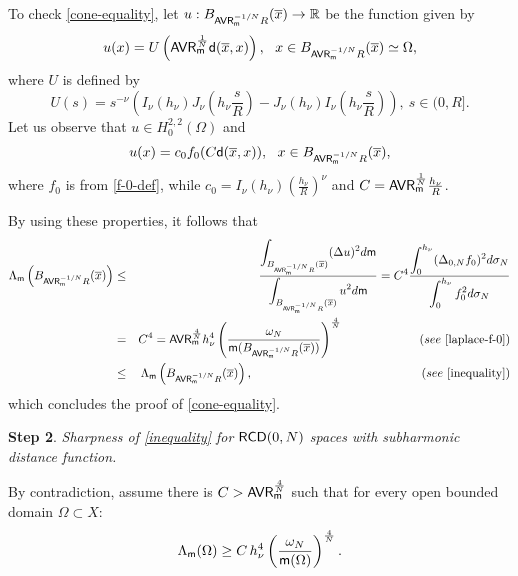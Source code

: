 \documentclass[11pt, reqno]{amsart}
\numberwithin{equation}{section}
\begin{document}
	To check \eqref{cone-equality}, let $u:B_{{\sf AVR}_ {\sf m}^{-{1}/{N}}R}(\overline x)\to \mathbb R$ be the function given by 
 \begin{equation}\label{extremal-candidate}
    u(x)=U\left({\sf AVR}_ {\sf m}^{\frac{1}{N}}{\sf d}(\overline x,x)\right),\ \  x\in B_{{\sf AVR}_ {\sf m}^{-{1}/{N}}R}(\overline x)\simeq \Omega,  
 \end{equation}
 where $U$ is defined by
	\begin{equation}\label{U-definition}
		U(s)=s^{-\nu}\left(I_\nu(h_\nu) J_\nu\left(h_\nu\frac{s}{ R}\right)-J_\nu(h_\nu)I_\nu\left(h_\nu\frac{s}{ R}\right)\right),\ s\in(0, R].
\end{equation}
	  Let us observe that $u\in H_0^{2,2}(\Omega)$ and
	   $$  u(x)=c_0f_0(C{\sf d}(\overline x,x)),\ \ x\in B_{{\sf AVR}_ {\sf m}^{-{1}/{N}}R}(\overline x),
	$$
where $f_0$ is from \eqref{f-0-def}, while 
	$c_0={I_\nu(h_\nu)}\left(\frac{h_\nu}{R}\right)^\nu$ and $C={\sf AVR}_ {\sf m}^{\frac{1}{N}}\frac{h_\nu}{R}$. 
	
	
	
	By using these properties, it follows that
	\begin{eqnarray*}
		\Lambda_{\sf m}\left(B_{{\sf AVR}_ {\sf m}^{-{1}/{N}}R}(\overline x)\right)&\leq& \frac{\displaystyle\int_{B_{{\sf AVR}_ {\sf m}^{-{1}/{N}}R}(\overline x)} (\Delta u)^2 {\rm d}{\sf m}}{\displaystyle\int_{B_{{\sf AVR}_ {\sf m}^{-{1}/{N}}R}(\overline x)} u^2 {\rm d}{\sf m}}=C^4	\frac{\displaystyle \int_{0}^{h_\nu} (\Delta_{0,N} f_0)^2{\rm d}\sigma_N }{\displaystyle\int_{0}^{h_\nu} f_0^2 {\rm d}\sigma_N}\\&=&C^4={\sf AVR}_ {\sf m}^\frac{4}{N}h_\nu^4\left(\frac{\omega_N}{{\sf m}(B_{{\sf AVR}_ {\sf m}^{-{1}/{N}}R}(\overline x))}\right)^\frac{4}{N}\qquad \   \qquad \qquad  ({\rm see}\  \eqref{laplace-f-0}) \\&\leq&\Lambda_{\sf m}\left(B_{{\sf AVR}_ {\sf m}^{-{1}/{N}}R}(\overline x)\right), \qquad \qquad \qquad \qquad \qquad \qquad \qquad ({\rm see}\  \eqref{inequality})
	\end{eqnarray*}
 which concludes the proof of \eqref{cone-equality}.  
		\smallskip
		
		\textbf{Step 2}.   {\it Sharpness of \eqref{inequality} for ${\sf RCD}(0,N)$ spaces with subharmonic distance function.}
		
		
		By contradiction,  assume there is  $C>{\sf AVR}_ {\sf m}^\frac{4}{N}$ such that for every  open bounded domain $\Omega\subset X$:
		\begin{equation}\label{inequality-0}
			\Lambda_{\sf m}(\Omega)\geq  C\,h_\nu^4\left(\frac{\omega_N}{{\sf m}(\Omega)}\right)^\frac{4}{N}.
		\end{equation}
		
\end{document}
